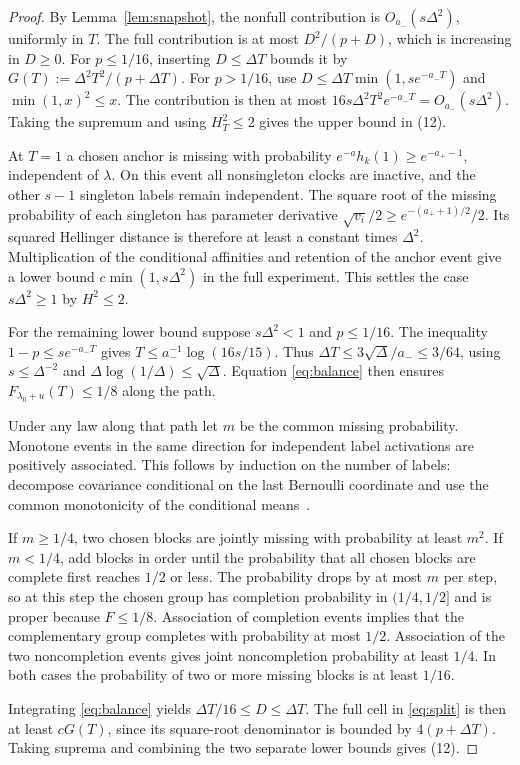 \documentclass[11pt]{article}
\begin{document}
\begin{proof}
By Lemma~\ref{lem:snapshot}, the nonfull contribution is \(O_{a_-}(s\Delta^2)\), uniformly in \(T\). The full contribution is at most \(D^2/(p+D)\), which is increasing in \(D\ge0\). For \(p\le1/16\), inserting \(D\le\Delta T\) bounds it by \(G(T):=\Delta^2 T^2/(p+\Delta T)\). For \(p>1/16\), use \(D\le\Delta T\min(1,se^{-a_-T})\) and \(\min(1,x)^2\le x\). The contribution is then at most \(16s\Delta^2T^2e^{-a_-T}=O_{a_-}(s\Delta^2)\). Taking the supremum and using \(H_T^2\le2\) gives the upper bound in (12).

At \(T=1\) a chosen anchor is missing with probability \(e^{-a}h_k(1)\ge e^{-a_+-1}\), independent of \(\lambda\). On this event all nonsingleton clocks are inactive, and the other \(s-1\) singleton labels remain independent. The square root of the missing probability of each singleton has parameter derivative \(\sqrt{v_i}/2\ge e^{-(a_++1)/2}/2\). Its squared Hellinger distance is therefore at least a constant times \(\Delta^2\). Multiplication of the conditional affinities and retention of the anchor event give a lower bound \(c\min(1,s\Delta^2)\) in the full experiment. This settles the case \(s\Delta^2\ge1\) by \(H^2\le2\).

For the remaining lower bound suppose \(s\Delta^2<1\) and \(p\le1/16\). The inequality \(1-p\le s e^{-a_-T}\) gives \(T\le a_-^{-1}\log(16s/15)\). Thus \(\Delta T\le3\sqrt\Delta/a_-\le3/64\), using \(s\le\Delta^{-2}\) and \(\Delta\log(1/\Delta)\le\sqrt\Delta\). Equation \eqref{eq:balance} then ensures \(F_{\lambda_0+u}(T)\le1/8\) along the path.

Under any law along that path let \(m\) be the common missing probability. Monotone events in the same direction for independent label activations are positively associated. This follows by induction on the number of labels: decompose covariance conditional on the last Bernoulli coordinate and use the common monotonicity of the conditional means~\cite{esary1967}.

If \(m\ge1/4\), two chosen blocks are jointly missing with probability at least \(m^2\). If \(m<1/4\), add blocks in order until the probability that all chosen blocks are complete first reaches \(1/2\) or less. The probability drops by at most \(m\) per step, so at this step the chosen group has completion probability in \((1/4,1/2]\) and is proper because \(F\le1/8\). Association of completion events implies that the complementary group completes with probability at most \(1/2\). Association of the two noncompletion events gives joint noncompletion probability at least \(1/4\). In both cases the probability of two or more missing blocks is at least \(1/16\).

Integrating \eqref{eq:balance} yields \(\Delta T/16\le D\le\Delta T\). The full cell in \eqref{eq:split} is then at least \(cG(T)\), since its square-root denominator is bounded by \(4(p+\Delta T)\). Taking suprema and combining the two separate lower bounds gives (12). \end{proof}
\end{document}

